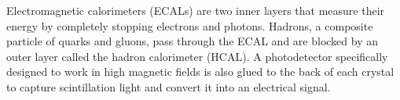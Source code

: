 

Electromagnetic calorimeters (ECALs) are two inner layers that measure their energy by completely stopping electrons and photons. Hadrons, a composite particle of quarks and gluons, pass through the ECAL and are blocked by an outer layer called the hadron calorimeter (HCAL). A photodetector specifically designed to work in high magnetic fields is also glued to the back of each crystal to capture scintillation light and convert it into an electrical signal.
 

